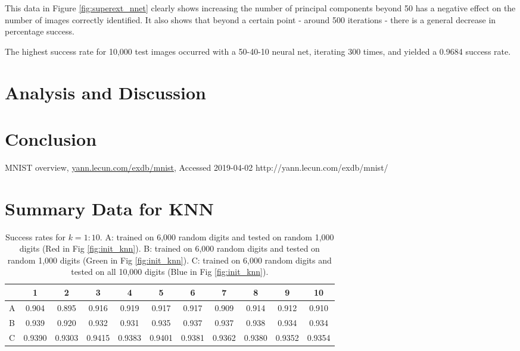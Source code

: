 \documentclass[11pt]{article} %
\begin{document}
This data in Figure \ref{fig:superext_nnet} clearly shows increasing the number of principal components beyond 50 has a negative effect on the number of images correctly identified. It also shows that beyond a certain point - around 500 iterations - there is a general decrease in percentage success. 

The highest success rate for 10,000 test images occurred with a 50-40-10 neural net, iterating 300 times, and yielded a 0.9684 success rate.


\section{Analysis and Discussion}

\section{Conclusion}

\newpage
\begin{thebibliography}{9}



 MNIST overview, \url{yann.lecun.com/exdb/mnist}, Accessed 2019-04-02
http://yann.lecun.com/exdb/mnist/
\end{thebibliography}

\newpage

\appendix
\label{appendix}
\section{Summary Data for KNN}
\label{sec:AppData}

\begin{table}[h]
\begin{center}
\begin{tabular}{l| c c c c c c c c c c}
 & 1 & 2 & 3 & 4 & 5 & 6 & 7 & 8 & 9 & 10\\
\hline
A & 0.904 & 0.895 & 0.916 & 0.919 & 0.917 & 0.917 & 0.909 & 0.914 & 0.912 & 0.910\\
B & 0.939 & 0.920 & 0.932 & 0.931 & 0.935 & 0.937 & 0.937 & 0.938 & 0.934 & 0.934\\
C & 0.9390 & 0.9303 & 0.9415 & 0.9383 & 0.9401 & 0.9381 & 0.9362 & 0.9380 & 0.9352 & 0.9354\\
\end{tabular}
\caption{Success rates for $k = 1:10$. A: trained on 6,000 random digits and tested on random 1,000 digits (Red in Fig \ref{fig:init_knn}). B: trained on 6,000 random digits and tested on random 1,000 digits (Green in Fig \ref{fig:init_knn}). C: trained on 6,000 random digits and tested on all 10,000 digits (Blue in Fig \ref{fig:init_knn}).}
\label{rand-10-all-test}
\end{center}
\end{table}
\end{document}
